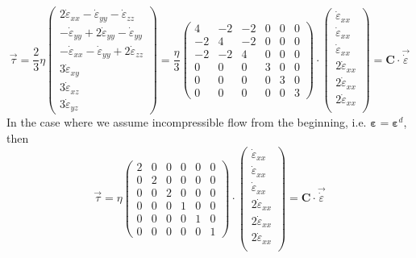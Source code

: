 \[
\vec \tau  
= \frac{2}{3} \eta
\left(
\begin{array}{c}
2\dot\varepsilon_{xx} -\dot\varepsilon_{yy} -\dot\varepsilon_{zz} \\ 
-\dot\varepsilon_{yy} +2\dot\varepsilon_{yy} -\dot\varepsilon_{yy} \\ 
-\dot\varepsilon_{xx} -\dot\varepsilon_{yy} +2\dot\varepsilon_{zz} \\
3\dot\varepsilon_{xy} \\
3\dot\varepsilon_{xz} \\
3\dot\varepsilon_{yz} 
\end{array}
\right)
=
\frac{\eta}{3}
\left(
\begin{array}{cccccc}
4 & -2& -2& 0& 0& 0\\
-2 & 4& -2& 0& 0& 0\\
-2 & -2& 4& 0& 0& 0\\
0 &0 &0 & 3& 0& 0\\
0 &0 &0 & 0& 3& 0\\
0 &0 &0 & 0& 0& 3 
\end{array}
\right)
\cdot
\left(
\begin{array}{c}
\dot\varepsilon_{xx} \\
\dot\varepsilon_{xx} \\
\dot\varepsilon_{xx} \\
2\dot\varepsilon_{xx} \\
2\dot\varepsilon_{xx} \\
2\dot\varepsilon_{xx} \\
\end{array}
\right)
=
{\bm C} \cdot \vec{\dot \varepsilon}
\]
In the case where we assume incompressible flow from the beginning, i.e. ${\bm \varepsilon}={\bm \varepsilon}^d$, then 
\[
\vec \tau  
=
\eta
\left(
\begin{array}{cccccc}
2 & 0& 0& 0& 0& 0\\
0 & 2& 0& 0& 0& 0\\
0 & 0& 2& 0& 0& 0\\
0 &0 &0 & 1& 0& 0\\
0 &0 &0 & 0& 1& 0\\
0 &0 &0 & 0& 0& 1 
\end{array}
\right)
\cdot
\left(
\begin{array}{c}
\dot\varepsilon_{xx} \\
\dot\varepsilon_{xx} \\
\dot\varepsilon_{xx} \\
2\dot\varepsilon_{xx} \\
2\dot\varepsilon_{xx} \\
2\dot\varepsilon_{xx} \\
\end{array}
\right)
=
{\bm C} \cdot \vec{\dot \varepsilon}
\]

